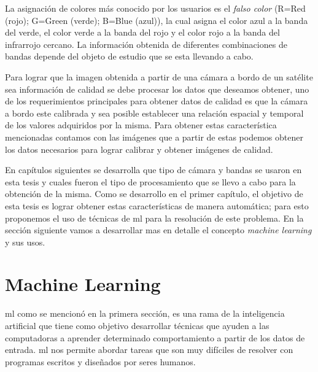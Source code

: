 La asignación de colores más conocido por los usuarios es el \textit{falso color} (R=Red (rojo); G=Green (verde); B=Blue (azul)), la cual asigna el color azul a la banda del verde, el color verde a la banda del rojo y el color rojo a la banda del infrarrojo cercano. La información obtenida de diferentes combinaciones de bandas depende del objeto de estudio que se esta llevando a cabo.


Para lograr que la imagen obtenida a partir de una cámara a bordo de un satélite sea información de calidad se debe procesar los datos que deseamos obtener, uno de los requerimientos principales para obtener datos de calidad es que la cámara a bordo este calibrada y sea posible establecer una relación espacial y temporal de los valores adquiridos por la misma. Para obtener estas característica mencionadas contamos con las imágenes que a partir de estas podemos obtener los datos necesarios para lograr calibrar y obtener imágenes de calidad. 

En capítulos siguientes se desarrolla que tipo de cámara y bandas se usaron en esta tesis y cuales fueron el tipo de procesamiento que se llevo a cabo para la obtención de la misma. Como se desarrollo en el primer capítulo, el objetivo de esta tesis es lograr obtener estas características de manera automática; para esto proponemos el uso de técnicas de \ac{ml} para la resolución de este problema. En la sección siguiente vamos a desarrollar mas en detalle  el concepto \textit{machine learning} y sus usos.






\section{Machine Learning}\label{sec:machinelaerning}

\ac{ml} como se mencionó en la primera sección, es una rama de la inteligencia artificial que tiene como objetivo desarrollar técnicas que ayuden a las computadoras a aprender determinado comportamiento a partir de los datos de entrada. \ac{ml} nos permite abordar tareas que son muy difíciles de resolver con programas escritos y diseñados por seres humanos.

